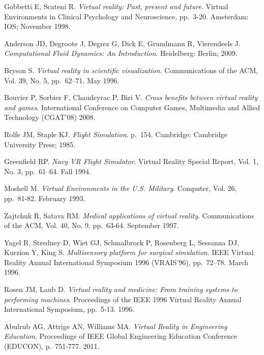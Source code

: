 
\begin{thebibliography}{99}

  Gobbetti E, Scateni R.
  \textit{Virtual reality: Past, present and future}.
  Virtual Environments in Clinical Psychology and Neuroscience,
  pp.~3-20.
  Amsterdam: IOS;
  November 1998.
  
  Anderson JD, Degroote J, Degrez G, Dick E, Grundmann R, Vierendeels J.
  \textit{Computational Fluid Dynamics: An Introduction}.
  Heidelberg: Berlin;
  2009.
  
  Bryson S.
  \textit{Virtual reality in scientific visualization}.
  Communications of the ACM, Vol. 39, No. 5,
  pp.~62–71.
  May 1996.
  
  Bouvier P, Sorbier F, Chaudeyrac P, Biri V.
  \textit{Cross benefits between virtual reality and games}.
  International Conference on Computer Games, Multimedia and Allied Technology (CGAT’08)
  2008.
  
  Rolfe JM, Staple KJ.
  \textit{Flight Simulation}.
  p.~154.
  Cambridge: Cambridge University Press;
  1985. 

  Greenfield RP.
  \textit{Navy VR Flight Simulator}.
  Virtual Reality Special Report, Vol. 1, No. 3,
  pp.~61–64.
  Fall 1994.

  Moshell M.
  \textit{Virtual Environments in the U.S. Military}.
  Computer, Vol. 26,
  pp.~81-82.
  February 1993.
  
  Zajtchuk R, Satava RM.
  \textit{Medical applications of virtual
reality}.
  Communications of the ACM, Vol. 40, No. 9,
  pp.~63-64.
  September 1997.

  Yagel R, Stredney D, Wiet GJ, Schmalbrock P, Rosenberg L, Sessanna DJ, Kurzion Y, King S.
  \textit{Multisensory platform for surgical simulation}.
  IEEE Virtual Reality Annual International Symposium 1996 (VRAIS’96),
  pp.~72–78.
  March 1996.
  
  Rosen JM, Laub D.
  \textit{Virtual reality and medicine: From
training systems to performing machines}.
  Proceedings of the IEEE 1996 Virtual Reality Annual International Symposium,
  pp.~5-13.
  1996.
  
  Abulrub AG, Attrige AN, Williams MA. 
  \textit{Virtual Reality in Engineering Education}.
  Proceedings of IEEE Global Engineering Education Conference (EDUCON),
  p.~751-777.
  2011.
  

\end{thebibliography}
